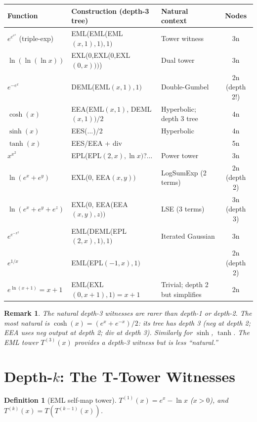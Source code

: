 \documentclass[11pt]{article}
\newtheorem{definition}[theorem]{Definition}
\newtheorem{remark}[theorem]{Remark}
\begin{document}
\begin{center}
\begin{longtable}{lllc}
\toprule
Function & Construction (depth-3 tree) & Natural context & Nodes \\
\midrule
$e^{e^{e^x}}$ (triple-exp) & EML(EML(EML$(x,1),1),1)$ & Tower witness & 3n \\
$\ln(\ln(\ln x))$ & EXL(0,EXL(0,EXL$(0,x)))$) & Dual tower & 3n \\
$e^{-e^x}$ & DEML(EML$(x,1),1)$ & Double-Gumbel & 2n (depth 2!) \\
$\cosh(x)$ & EEA(EML$(x,1)$, DEML$(x,1))/2$ & Hyperbolic; depth 3 tree & 4n \\
$\sinh(x)$ & EES(...)/2 & Hyperbolic & 4n \\
$\tanh(x)$ & EES/EEA + div & & 5n \\
$x^{x^2}$ & EPL(EPL$(2,x), \ln x)$?... & Power tower & 3n \\
$\ln(e^x + e^y)$ & EXL(0, EEA$(x,y))$ & LogSumExp (2 terms) & 2n (depth 2) \\
$\ln(e^x + e^y + e^z)$ & EXL(0, EEA(EEA$(x,y),z))$ & LSE (3 terms) & 3n (depth 3) \\
$e^{e^{-x^2}}$ & EML(DEML(EPL$(2,x),1),1)$ & Iterated Gaussian & 3n \\
$e^{1/x}$ & EML(EPL$(-1,x),1)$ & & 2n (depth 2) \\
$e^{\ln(x+1)} = x+1$ & EML(EXL$(0,x+1),1)=x+1$ & Trivial; depth 2 but simplifies & 2n \\
\bottomrule
\end{longtable}
\end{center}

\begin{remark}
The natural depth-3 witnesses are rarer than depth-1 or depth-2.
The most natural is $\cosh(x) = (e^x + e^{-x})/2$:
its tree has depth 3 (neg at depth 2; EEA uses neg output at depth 2;
div at depth 3). Similarly for $\sinh$, $\tanh$.
The EML tower $T^{(3)}(x)$ provides a depth-3 witness but is less ``natural.''
\end{remark}

\section{Depth-$k$: The T-Tower Witnesses}
\label{sec:tower}

\begin{definition}[EML self-map tower]
$T^{(1)}(x) = e^x - \ln x$ ($x>0$), and $T^{(k)}(x) = T(T^{(k-1)}(x))$.
\end{definition}
\end{document}
